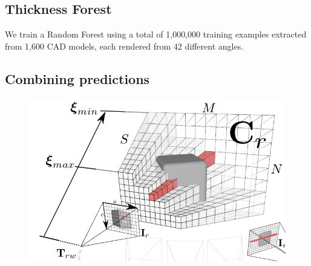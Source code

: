 \documentclass[10pt,twocolumn,letterpaper]{article}
\newcommand{\point}{\mathbf{p}}
\begin{document}





\subsection{Thickness Forest}

We train a Random Forest using a total of 1,000,000 training examples extracted from 1,600 CAD models, each rendered from 42 different angles.


\subsection{Combining predictions}

\begin{figure}
    \centering%
    \includegraphics[width=1.0\columnwidth]{dtam_voxels.png}%
    \label{fig:dtam_voxels}%
\end{figure}
\end{document}
